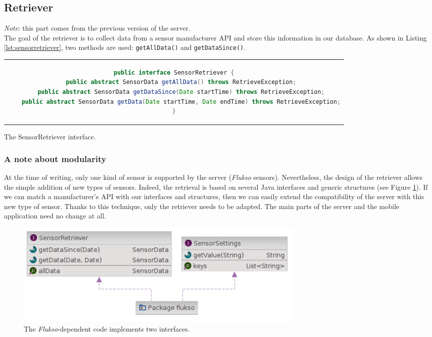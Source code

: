 \documentclass[a4paper, oneside, 11pt]{book}
\begin{document}
\subsection{Retriever}
\emph{Note}: this part comes from the previous version of the server. \\

The goal of the retriever is to collect data from a sensor manufacturer API and store this information in our database. As shown in Listing \ref{lst:sensorretriever}, two methods are used: \texttt{getAllData()} and \texttt{getDataSince()}.

\begin{listing}[!h]
	\centering
	\begin{tabular}{c}
		\begin{lstlisting}[language=Java]
public interface SensorRetriever {
	public abstract SensorData getAllData() throws RetrieveException;
	public abstract SensorData getDataSince(Date startTime) throws RetrieveException;
	public abstract SensorData getData(Date startTime, Date endTime) throws RetrieveException;
}
		\end{lstlisting}
	\end{tabular}
	\caption{The SensorRetriever interface.}
	\label{lst:sensorretriever}
\end{listing}

\subsubsection{A note about modularity}
At the time of writing, only one kind of sensor is supported by the server (\textit{Flukso} sensors). Nevertheless, the design of the retriever allows the simple addition of new types of sensors. Indeed, the retrieval is based on several Java interfaces and generic structures (see Figure \ref{fig:flukso_struct}). If we can match a manufacturer’s API with our interfaces and structures, then we can easily extend the compatibility of the server with this new type of sensor. Thanks to this technique, only the retriever needs to be adapted. The main parts of the server and the mobile application need no change at all.

\begin{figure}[htbp]
	\centerline{\includegraphics[width=0.7\textwidth]{flukso_struct.png}}
	\caption{The \textit{Flukso}-dependent code implements two interfaces.}
	\label{fig:flukso_struct}
\end{figure}
\end{document}
